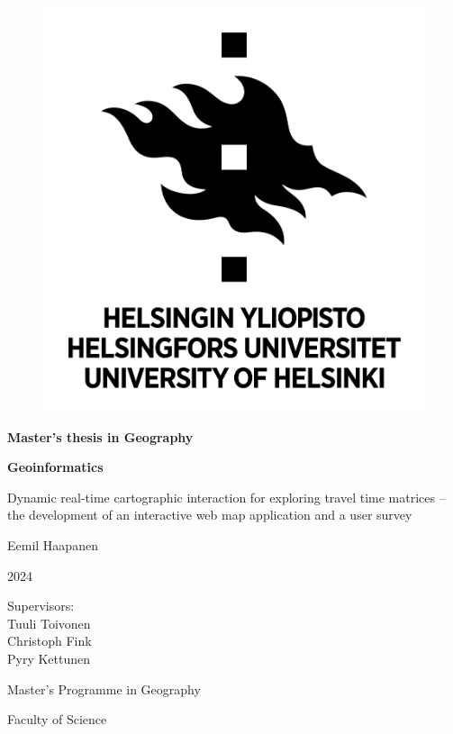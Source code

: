 \newcommand{\mytitle}{%
Dynamic real-time cartographic interaction for exploring travel time matrices --
the development of an interactive web map application and a user survey
}

\begin{center}{
    \begin{figure}[H]
        \centering
        \includegraphics[scale=0.4]{visual/other/helsinki_uni_logo.jpg}
    \end{figure}

    \bigskip
    \bigskip
    \bigskip
    \textbf{Master's thesis in Geography} \par
    \textbf{Geoinformatics} \par

    \bigskip
    \bigskip
    \mytitle

    \bigskip
    \bigskip
    Eemil Haapanen

    2024

    \vfill

    Supervisors: \\
    Tuuli Toivonen \\
    Christoph Fink \\
    Pyry Kettunen \par
    \bigskip
    \bigskip
    \bigskip
    Master's Programme in Geography \par
    Faculty of Science \par
}
\end{center}
